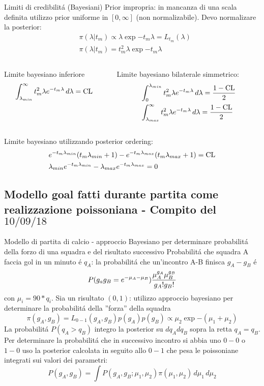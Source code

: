 \begin{frame}{Limiti di credibilit\'a (Bayesiani)}
Prior impropria: in mancanza di una scala definita utilizzo prior uniforme in $[0,\infty]$ (non normalizabile). Devo normalizare la posterior:
\begin{align*}
&\pi(\lambda|t_m)\propto \lambda\exp{-t_m\lambda}=L_{t_m}(\lambda)\\
&\pi(\lambda|t_m)=t_m^2\lambda\exp{-t_m\lambda}
\end{align*}
\begin{columns}[T]
	\begin{column}{0.5\textwidth}
Limite bayesiano inferiore
\begin{equation*}
\int_{\lambda_{min}}^{\infty}t_m^2\lambda e^{-t_m\lambda}\,d\lambda=\operatorname{CL}{}
\end{equation*}
	\end{column}
	\begin{column}{0.5\textwidth}
Limite bayesiano bilaterale simmetrico:
\begin{align*}
&\int_0^{\lambda_{min}}t_m^2\lambda e^{-t_m\lambda}\,d\lambda=\frac{1-\operatorname{CL}}{2}\\
&\int_{\lambda_{max}}^{\infty}t_m^2\lambda e^{-t_m\lambda}\,d\lambda=\frac{1-\operatorname{CL}}{2}
\end{align*}
\end{column}
\end{columns}
Limite bayesiano utilizzando posterior ordering:
\begin{align*}
&e^{-t_m\lambda_{min}}(t_m\lambda_{min}+1)-e^{-t_m\lambda_{max}}(t_m\lambda_{max}+1)=\operatorname{CL}\\
&\lambda_{min}e^{-t_m\lambda_{min}}-\lambda_{max}e^{-t_m\lambda_{max}}=0
\end{align*}
\end{frame}

\subsection{Modello goal fatti durante partita come realizzazione poissoniana - Compito del $10/09/18$}

\begin{frame}{Modello di partita di calcio - approccio Bayesiano per determinare probabilit\'a della forzo di una squadra e del risultato successivo}
Probabilit\'a che squadra A faccia gol in un minuto \'e $q_A$: la probabilit\'a che un'incontro A-B finisca $g_A-g_B$ \'e
\[P(g_ag_B=e^{-\mu_A-\mu_B})\frac{\mu_A^{g_A}\mu_B^{g_B}}{g_A!g_B!}\] con $\mu_i=90*q_i$.
Sia un risultato $(0,1)$: utilizzo approccio bayesiano per determinare la probabilit\'a della ''forza'' della squadra
\[\pi(g_A,g_B)=L_{0-1}(g_A,g_B)p(g_A)p(g_B)\propto\mu_2\exp{-(\mu_1+\mu_2)}\]
La probabilit\'a $P(q_A>q_B)$ integro la posterior su $dq_Adq_B$ sopra la retta $q_A=q_B$. Per determinare la probabilit\'a che in successivo incontro si abbia uno $0-0$ o $1-0$ uso la posterior calcolata in seguito allo $0-1$ che pesa le poissoniane integrati sui valori dei parametri:
\[P(g_A,g_B)=\int P(g_A,g_B;\mu_1,\mu_2)\pi(\mu_1,\mu_2)\,d\mu_1\,d\mu_2\]
\end{frame}

